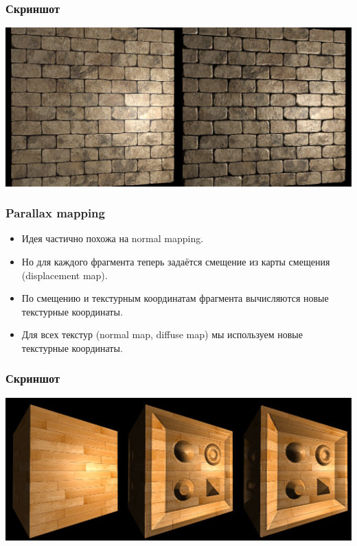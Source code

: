 \documentclass{beamer}
\begin{document}
\begin{frame}
	\frametitle{Скриншот}
	\begin{center}
		\includegraphics[scale=0.26]{normal.png} 
	\end{center}
\end{frame}

\begin{frame}
	\frametitle{Parallax mapping}
	
	\begin{itemize}
		\item<1-> Идея частично похожа на normal mapping.
		\item<1-> Но для каждого фрагмента теперь задаётся смещение из карты смещения (displacement map).
		\item<1-> По смещению и текстурным координатам фрагмента вычисляются новые текстурные координаты.
		\item<1-> Для всех текстур (normal map, diffuse map) мы используем новые текстурные координаты.
	\end{itemize}
\end{frame}

\begin{frame}
	\frametitle{Скриншот}
	\begin{center}
		\includegraphics[scale=0.24]{parallax.png} 
	\end{center}
\end{frame}
\end{document}
